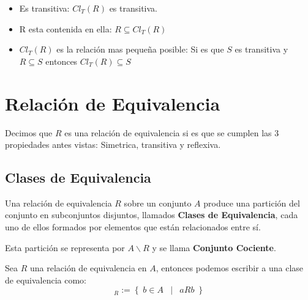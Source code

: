 \documentclass[12pt, fleqn]{report}                             %
\DeclareMathOperator \Space     {\quad}                         %
\DeclareMathOperator \MiniSpace {\;}                            %
\newcommand \Such           {\MiniSpace | \MiniSpace}           %
\theoremstyle{break}                                            %
\newcommand{\Set}[1]            {\left\{ \; #1 \; \right\}}     %
\begin{document}
                \begin{itemize}
                    \item Es transitiva: $Cl_T(R)$ es transitiva. 
                    \item R esta contenida en ella: $R \subseteq Cl_T(R)$
                    \item $Cl_T(R)$ es la relación mas pequeña posible: 
                    Si es que $S$ es transitiva y $R \subseteq S$ entonces $Cl_T(R) \subseteq S$
                \end{itemize}


        \clearpage
        \section{Relación de Equivalencia}
            Decimos que $R$ es una relación de equivalencia si es que se cumplen las 3
            propiedades antes vistas: Simetrica, transitiva y reflexiva.


            \subsection{Clases de Equivalencia}

                Una relación de equivalencia $R$ sobre un conjunto $A$ produce una partición
                del conjunto en subconjuntos disjuntos, llamados \textbf{Clases de
                Equivalencia}, cada uno de ellos formados por elementos que están
                relacionados entre sí.

                Esta partición se representa por $A \backslash R$ y se llama
                \textbf{Conjunto Cociente}.

                Sea $R$ una relación de equivalencia en $A$, entonces podemos escribir
                a una clase de equivalencia como:
                \begin{equation*}
                    [a]_R := \Set{ b \in A \Such a R b}
                \end{equation*} 


\end{document}

